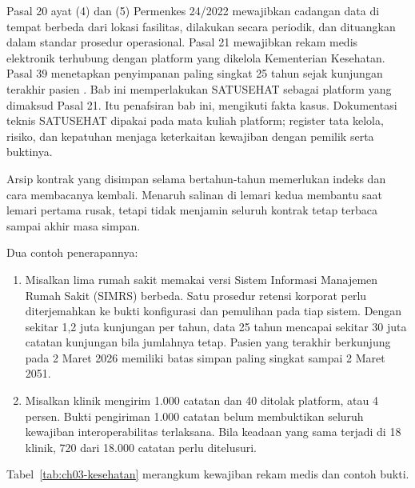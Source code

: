 Pasal 20 ayat (4) dan (5) Permenkes 24/2022 mewajibkan cadangan data di tempat berbeda dari
lokasi fasilitas, dilakukan secara periodik, dan dituangkan dalam standar prosedur operasional.
Pasal 21 mewajibkan rekam medis elektronik terhubung dengan platform yang dikelola Kementerian
Kesehatan. Pasal 39 menetapkan penyimpanan paling singkat 25 tahun sejak kunjungan terakhir
pasien \cite{permenkes24-2022}. Bab ini memperlakukan SATUSEHAT sebagai platform yang dimaksud
Pasal 21. Itu penafsiran bab ini, mengikuti fakta kasus. Dokumentasi teknis SATUSEHAT dipakai
pada mata kuliah platform; register tata kelola, risiko, dan kepatuhan menjaga keterkaitan
kewajiban dengan pemilik serta buktinya.

Arsip kontrak yang disimpan selama bertahun-tahun memerlukan indeks dan cara membacanya kembali.
Menaruh salinan di lemari kedua membantu saat lemari pertama rusak, tetapi tidak menjamin seluruh
kontrak tetap terbaca sampai akhir masa simpan.

Dua contoh penerapannya:
\begin{enumerate}
  \item Misalkan lima rumah sakit memakai versi Sistem Informasi Manajemen Rumah Sakit (SIMRS)
  berbeda. Satu prosedur retensi korporat perlu diterjemahkan ke bukti konfigurasi dan pemulihan
  pada tiap sistem. Dengan sekitar 1,2 juta kunjungan per tahun, data 25 tahun mencapai sekitar
  30 juta catatan kunjungan bila jumlahnya tetap. Pasien yang terakhir berkunjung pada 2 Maret
  2026 memiliki batas simpan paling singkat sampai 2 Maret 2051.
  \item Misalkan klinik mengirim 1.000 catatan dan 40 ditolak platform, atau 4 persen. Bukti
  pengiriman 1.000 catatan belum membuktikan seluruh kewajiban interoperabilitas terlaksana. Bila
  keadaan yang sama terjadi di 18 klinik, 720 dari 18.000 catatan perlu ditelusuri.
\end{enumerate}

Tabel~\ref{tab:ch03-kesehatan} merangkum kewajiban rekam medis dan contoh bukti.

